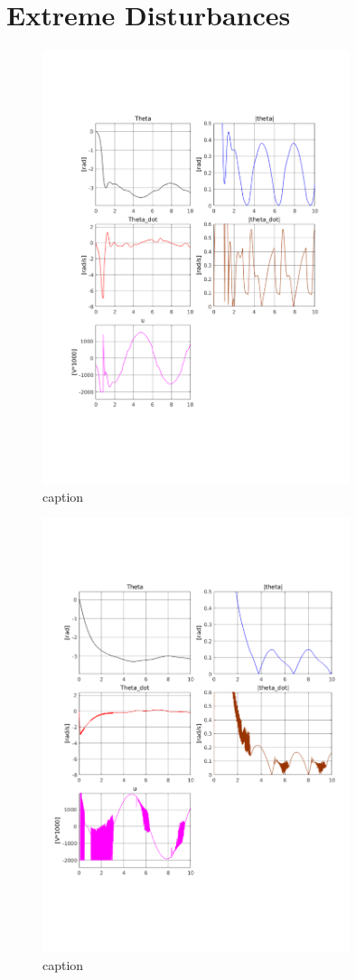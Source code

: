 \chapter{Extreme Disturbances} %
\label{cha:extreme_dis}
\begin{figure}[htbp]
        \centering
        \includegraphics[width=0.8\textwidth,trim=0.5cm 5cm 0.5cm 4cm, clip]{smc_extreme_dis.pdf}
        \caption{caption}
        \label{fig:label}
\end{figure}

\begin{figure}[htbp]
        \centering
        \includegraphics[width=0.8\textwidth,trim=0.5cm 5cm 0.5cm 4cm, clip]{lyap_extreme_dis.pdf}
        \caption{caption}
        \label{fig:label}
\end{figure}


